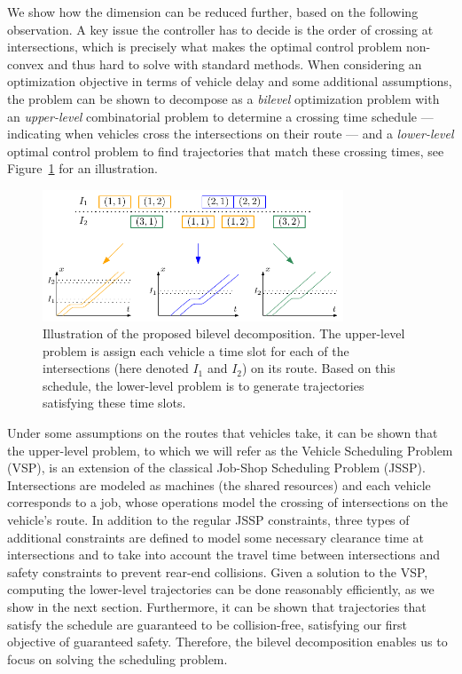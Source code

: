 \documentclass{article}
\theoremstyle{definition}
\theoremstyle{plain}
\begin{document}
We show how the dimension can be reduced further, based on the following
observation. A key issue the controller has to decide is the order of crossing
at intersections, which is precisely what makes the optimal control problem
non-convex and thus hard to solve with standard methods. When considering an
optimization objective in terms of vehicle delay and some additional
assumptions, the problem can be shown to decompose as a \textit{bilevel} optimization
problem with an \textit{upper-level} combinatorial problem to determine a crossing time
schedule --- indicating when vehicles cross the intersections on their route
--- and a \textit{lower-level} optimal control problem to find trajectories that match
these crossing times, see Figure~\ref{fig:network_bilevel} for an illustration.

\begin{figure}[h]
  \centering
  \includegraphics[width=0.8\textwidth]{figures/network_bilevel.pdf}
  \caption{Illustration of the proposed bilevel decomposition. The upper-level
    problem is assign each vehicle a time slot for each of the intersections
    (here denoted $I_{1}$ and $I_{2}$) on its route. Based on this schedule, the
    lower-level problem is to generate trajectories satisfying these time
    slots.}
  \label{fig:network_bilevel}
\end{figure}

Under some assumptions on the routes that vehicles take, it can be shown that
the upper-level problem, to which we will refer as the Vehicle Scheduling
Problem (VSP), is an extension of the classical Job-Shop Scheduling Problem
(JSSP). Intersections are modeled as machines (the shared resources) and each
vehicle corresponds to a job, whose operations model the crossing of
intersections on the vehicle's route.
%
In addition to the regular JSSP constraints, three types of additional
constraints are defined to model some necessary clearance time at intersections
and to take into account the travel time between intersections and safety
constraints to prevent rear-end collisions.
Given a solution to the VSP, computing the lower-level trajectories can be done
reasonably efficiently, as we show in the next section. Furthermore, it can be
shown that trajectories that satisfy the schedule are guaranteed to
be collision-free, satisfying our first objective of guaranteed safety.
Therefore, the bilevel decomposition enables us to focus on solving the
scheduling problem.
\end{document}
